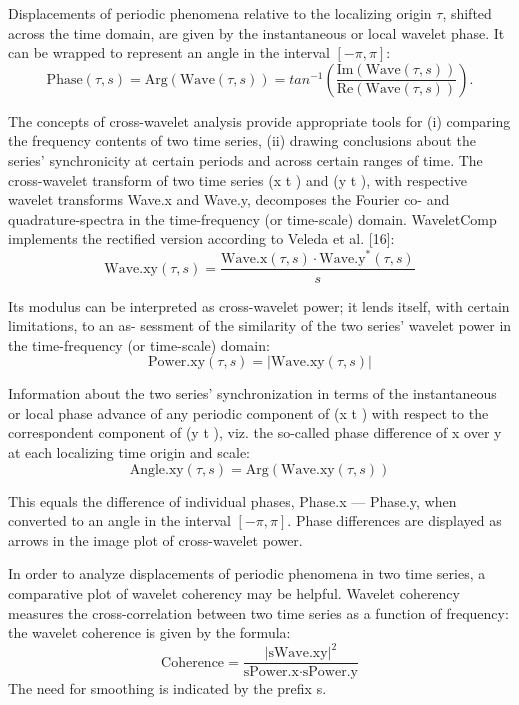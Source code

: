 \documentclass{biophys-new}
\begin{document}
Displacements of periodic phenomena relative to the localizing origin $\tau$, shifted across the time domain, are given by the instantaneous or local wavelet phase.
It can be wrapped to represent an angle in the interval $[-\pi,\pi]$:
\begin{equation}\label{eq:phase}
\text{Phase}(\tau, s)=\text{Arg}(\text{Wave}(\tau, s))=tan^{-1}\left(\frac{\text{Im}(\text{Wave}(\tau, s))}{\text{Re}(\text{Wave}(\tau, s))}\right).
\end{equation}

The concepts of cross-wavelet analysis provide appropriate tools for (i) comparing the frequency contents of two time series, (ii) drawing conclusions about the series’ synchronicity at certain periods and across certain ranges of time.
The cross-wavelet transform of two time series (x t ) and (y t ), with respective wavelet transforms Wave.x and Wave.y, decomposes the Fourier co- and quadrature-spectra in the time-frequency (or time-scale) domain.
WaveletComp implements the rectified version according to Veleda et al. [16]:
\begin{equation}\label{eq:wave.xy}
\text{Wave.xy}(\tau, s)=\frac{\text{Wave.x}(\tau, s)\cdot\text{Wave.y}^{\ast}(\tau, s)}{s}
\end{equation}

Its modulus can be interpreted as cross-wavelet power; it lends itself, with certain limitations, to an as-
sessment of the similarity of the two series’ wavelet power in the time-frequency (or time-scale) domain:
\begin{equation}\label{eq:power.xy}
\text{Power.xy}(\tau, s)=|\text{Wave.xy}(\tau, s)|
\end{equation}

Information about the two series’ synchronization in terms of the instantaneous or local phase advance of any periodic component of (x t ) with respect to the correspondent component of (y t ), viz. the so-called phase difference of x over y at each localizing time origin and scale:
\begin{equation}\label{eq:angle}
\text{Angle.xy}(\tau, s)=\text{Arg}(\text{Wave.xy}(\tau, s))
\end{equation}

This equals the difference of individual phases, Phase.x --- Phase.y, when converted to an angle in the
interval $[-\pi,\pi]$.
Phase differences are displayed as arrows in the image plot of cross-wavelet power.

In order to analyze displacements of periodic phenomena in two time series, a comparative plot of wavelet coherency may be helpful.
Wavelet coherency  measures the cross-correlation between two time series as a function of frequency: the wavelet coherence is given by the formula:
\begin{equation}\label{eq:coherence}
\text{Coherence}=\frac{|\text{sWave.xy}|^2}{\text{sPower.x}\cdot\text{sPower.y}}
\end{equation}
The need for smoothing is indicated by the prefix s.
\end{document}
